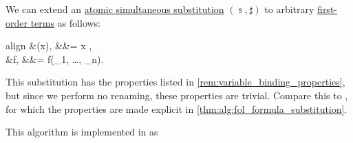 \begin{algorithm}\label{alg:fol_term_substitution}\mimprovised
  We can extend an \hyperref[def:atomic_lambda_term_substitution]{atomic simultaneous substitution} \( (\Bbbs, \sharp) \) to arbitrary \hyperref[def:fol_term]{first-order terms} as follows:
  \begin{empheq}[left={\tau[\Bbbs]} \coloneqq \empheqlbrace]{align}
    &\Bbbs(x),                                                   &&\tau = x \in {},               \label{eq:alg:fol_term_substitution/var} \\
    &f, &&\tau = f(\sigma_1, \ldots, \sigma_n). \label{eq:alg:fol_term_substitution/fun}
  \end{empheq}
\end{algorithm}
\begin{comments}
  \item This substitution has the properties listed in \cref{rem:variable_binding_properties}, but since we perform no renaming, these properties are trivial. Compare this to , for which the properties are made explicit in \cref{thm:alg:fol_formula_substitution}.

  \item This algorithm is implemented in \cite{notebook:code} as
\end{comments}

